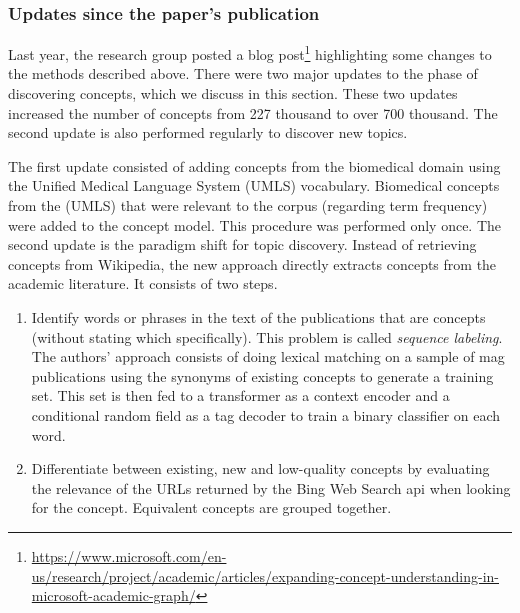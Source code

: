 \subsubsection{Updates since the paper's publication} \label{mag_updates}

Last year, the research group posted a blog post\footnote{\url{https://www.microsoft.com/en-us/research/project/academic/articles/expanding-concept-understanding-in-microsoft-academic-graph/}} highlighting some changes to the methods described above. There were two major updates to the phase of discovering concepts, which we discuss in this section. These two updates increased the number of concepts from 227 thousand to over 700 thousand. The second update is also performed regularly to discover new topics.

The first update consisted of adding concepts from the biomedical domain using the  Unified Medical Language System (UMLS) vocabulary. Biomedical concepts from the (UMLS) that were relevant to the corpus (regarding term frequency) were added to the concept model. This procedure was performed only once. The second update is the paradigm shift for topic discovery. Instead of retrieving concepts from Wikipedia, the new approach directly extracts concepts from the academic literature. It consists of two steps.

\begin{enumerate}
    \item Identify words or phrases in the text of the publications that are concepts (without stating which specifically). This problem is called \textit{sequence labeling}. The authors' approach consists of doing lexical matching on a sample of \acrshort{mag} publications using the synonyms of existing concepts to generate a training set. This set is then fed to a transformer as a context encoder and a conditional random field as a tag decoder to train a binary classifier on each word.
    \item Differentiate between existing, new and low-quality concepts by evaluating the relevance of the URLs returned by the Bing Web Search \acrshort{api} when looking for the concept. Equivalent concepts are grouped together.
\end{enumerate}